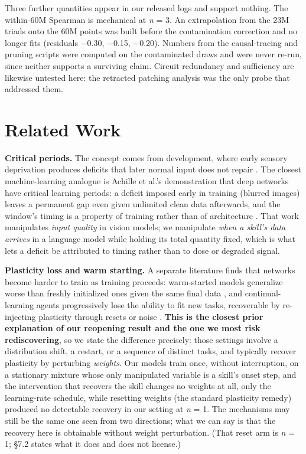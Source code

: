 \documentclass[11pt]{article}
\begin{document}
Three further quantities appear in our released logs and support nothing. The within-60M
Spearman is mechanical at \emph{n} = 3. An extrapolation from the 23M triads onto the 60M points
was built before the contamination correction and no longer fits (residuals −0.30, −0.15,
−0.20). Numbers from the causal-tracing and pruning scripts were computed on the contaminated
draws and were never re-run, since neither supports a surviving claim. Circuit redundancy and
sufficiency are likewise untested here: the retracted patching analysis was the only probe
that addressed them.

\section{Related Work}\label{related-work}

\textbf{Critical periods.} The concept comes from development, where early sensory deprivation
produces deficits that later normal input does not repair \citep{hubel-wiesel-1970,lenneberg-1967,johnson-newport-1989}. The closest machine-learning analogue is Achille et al.'s demonstration
that deep networks have critical learning periods: a deficit imposed early in training
(blurred images) leaves a permanent gap even given unlimited clean data afterwards, and the
window's timing is a property of training rather than of architecture \citep{achille-etal-2019}. That work manipulates \emph{input quality} in vision models; we manipulate
\emph{when a skill's data arrives} in a language model while holding its total quantity fixed,
which is what lets a deficit be attributed to timing rather than to dose or degraded signal.

\textbf{Plasticity loss and warm starting.} A separate literature finds that networks become
harder to train as training proceeds: warm-started models generalize worse than freshly
initialized ones given the same final data \citep{ash-adams-2020}, and continual-learning
agents progressively lose the ability to fit new tasks, recoverable by re-injecting
plasticity through resets or noise \citep{dohare-etal-2024,lyle-etal-2023,berariu-etal-2021}.
\textbf{This is the closest prior explanation of our reopening result and the one we most risk
rediscovering}, so we state the difference precisely: those settings involve a distribution
shift, a restart, or a sequence of distinct tasks, and typically recover plasticity by
perturbing \emph{weights}. Our models train once, without interruption, on a stationary mixture
whose only manipulated variable is a skill's onset step, and the intervention that recovers
the skill changes no weights at all, only the learning-rate schedule, while resetting weights
(the standard plasticity remedy) produced no detectable recovery in our setting at \emph{n} = 1.
The mechanisms may still be the same one seen from two directions; what we can say is that
the recovery here is obtainable without weight perturbation. (That reset arm is \emph{n} = 1;
§7.2 states what it does and does not license.)
\end{document}
